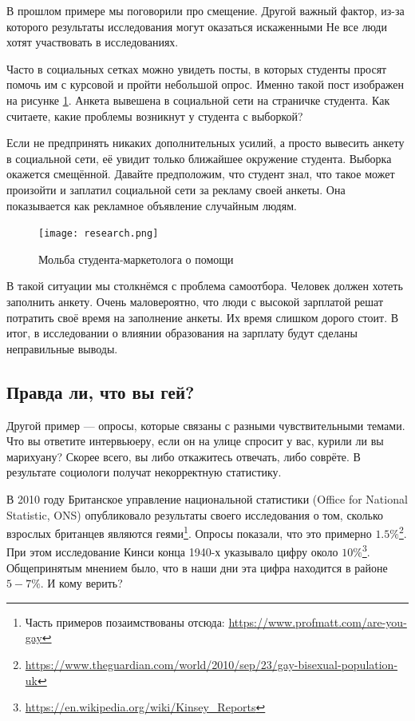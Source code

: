 \documentclass[12pt, a4paper, oneside]{article}
\begin{document}
В прошлом примере мы поговорили про смещение. Другой важный фактор, из-за которого результаты исследования могут оказаться искаженными  Не все люди хотят участвовать в исследованиях.  

Часто в социальных сетках можно увидеть посты, в которых студенты просят помочь им с курсовой и пройти небольшой опрос. Именно такой пост изображен на рисунке \ref{fig:salary}. Анкета вывешена в социальной сети на страничке студента. Как считаете, какие проблемы возникнут у студента с выборкой? 

Если не предпринять никаких дополнительных усилий, а просто вывесить анкету в социальной сети, её увидит только ближайшее окружение студента. Выборка окажется смещённой. Давайте предположим, что студент знал, что такое может произойти и заплатил социальной сети за рекламу своей анкеты. Она показывается как рекламное объявление случайным людям.  

\begin{figure}
    \begin{center}
    \texttt{[image: research.png]}
    \caption{Мольба студента-маркетолога о помощи} \label{fig:salary}
    \end{center}
\end{figure}
 
В такой ситуации мы столкнёмся с проблема самоотбора. Человек должен хотеть заполнить анкету. Очень маловероятно, что люди с высокой зарплатой решат потратить своё время на заполнение анкеты. Их время слишком дорого стоит. В итог, в исследовании о влиянии образования на зарплату будут сделаны неправильные выводы.  


\subsection{Правда ли, что вы гей?}

Другой пример --- опросы, которые связаны с разными чувствительными темами. Что вы ответите интервьюеру, если он на улице спросит у вас, курили ли вы марихуану? Скорее всего, вы либо откажитесь отвечать, либо соврёте. В результате социологи получат некорректную статистику. 

В 2010 году Британское управление национальной статистики (Office for National Statistic, ONS) опубликовало результаты своего исследования о том, сколько взрослых британцев являются геями\footnote{Часть примеров позаимствованы отсюда: \url{https://www.profmatt.com/are-you-gay}}. Опросы показали, что это примерно $1.5\%$\footnote{\url{https://www.theguardian.com/world/2010/sep/23/gay-bisexual-population-uk}}. При этом исследование Кинси конца 1940-х указывало цифру около $10\%$\footnote{\url{https://en.wikipedia.org/wiki/Kinsey_Reports}}. Общепринятым мнением было, что в наши дни эта цифра находится в районе $5-7\%$. И кому верить? 
\end{document}
